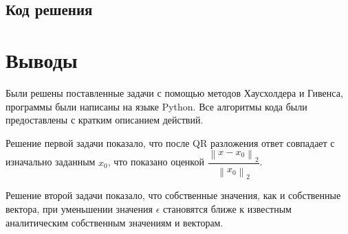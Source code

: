 \documentclass[a4paper]{article}
\begin{document}
\subsection{Код решения}



\newpage

\section{Выводы}

Были решены поставленные задачи с помощью методов Хаусхолдера и Гивенса, программы были написаны на языке Python. Все алгоритмы кода были предоставлены с кратким описанием действий. 

Решение первой задачи показало, что после QR разложения ответ совпадает с изначально заданным $x_0$, что показано оценкой $\dfrac{\left \| x - x_0 \right \|_{2}} {\left \| x_0 \right \|_{2}}$.

Решение второй задачи показало, что собственные значения, как и собственные вектора, при уменьшении значения $\epsilon$ становятся ближе к известным аналитическим собственным значениям и векторам. 
\end{document}
